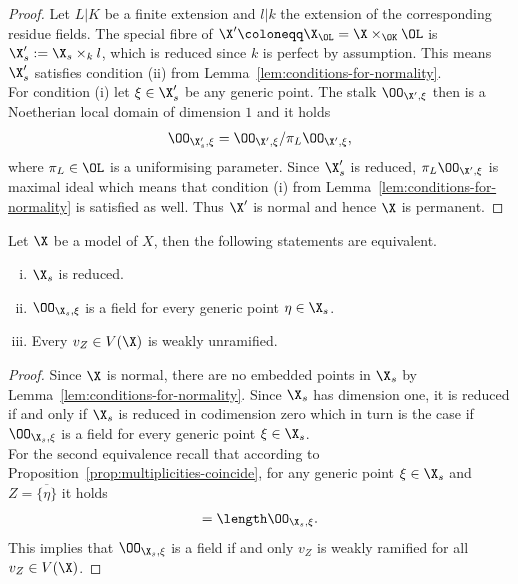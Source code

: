 \begin{proof}
    Let $L|K$ be a finite extension and $l|k$ the extension of the corresponding residue fields.
    The special fibre of $\X' \coloneqq \X_{\OL} = \X \times_{\OK} \OL$ is $\X'_s := \X_s \times_k l$,
    which is reduced since $k$ is perfect by assumption.
    This means $\X'_s$ satisfies condition (ii) from Lemma~\ref{lem:conditions-for-normality}. \\
    For condition (i) let $\xi \in \X'_s$ be any generic point.
    The stalk $\OO_{\X', \xi}$ then is a Noetherian local domain of dimension $1$ and it holds
    \begin{align}
        \OO_{\X'_s, \xi} = \OO_{\X', \xi}/\pi_L\OO_{\X', \xi},
    \end{align}
    where $\pi_L \in \OL$ is a uniformising parameter.
    Since $\X'_s$ is reduced, $\pi_L\OO_{\X',\xi}$ is maximal ideal which means that
    condition (i) from Lemma~\ref{lem:conditions-for-normality} is satisfied as well.
    Thus $\X'$ is normal and hence $\X$ is permanent.
\end{proof}

\begin{proposition}\label{prop:criterion-reducedness}
    Let $\X$ be a model of $X$, then the following statements are equivalent.
    \begin{enumerate}[(i)]
        \item $\X_s$ is reduced.
        \item $\OO_{\X_s, \xi}$ is a field for every generic point $\eta \in \X_s$.
        \item Every $v_Z \in V(\X)$ is weakly unramified.
    \end{enumerate}
\end{proposition}

\begin{proof}
    Since $\X$ is normal, there are no embedded points in $\X_s$ by Lemma~\ref{lem:conditions-for-normality}.
    Since $\X_s$ has dimension one, it is reduced if and only if $\X_s$ is reduced in codimension zero
    which in turn is the case if $\OO_{\X_s, \xi}$ is a field for every generic point $\xi \in \X_s$. \\
    For the second equivalence recall that according to Proposition~\ref{prop:multiplicities-coincide},
    for any generic point $\xi\in \X_s$ and $Z = \overline{\lbrace\eta\rbrace}$ it holds
    \begin{align}
        [\Gamma_{v_Z}: \Gamma_K] = \length \OO_{\X_s, \xi}.
    \end{align}
    This implies that $\OO_{\X_s, \xi}$ is a field if and only $v_Z$ is weakly ramified for all $v_Z \in V(\X)$.
\end{proof}

